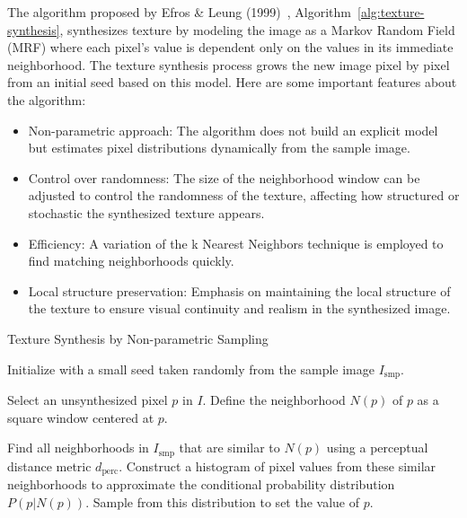 \documentclass{article}
\begin{document}
The algorithm proposed by Efros \& Leung (1999)~\cite{790383}, Algorithm~\ref{alg:texture-synthesis}, synthesizes texture by modeling the image as a Markov Random Field (MRF) where each pixel's value is dependent only on the values in its immediate neighborhood. 
The texture synthesis process grows the new image pixel by pixel from an initial seed based on this model. Here are some important features about the algorithm:
\begin{itemize}
  \item {Non-parametric approach:} The algorithm does not build an explicit model but estimates pixel distributions dynamically from the sample image.
  \item {Control over randomness:} The size of the neighborhood window can be adjusted to control the randomness of the texture, affecting how structured or stochastic the synthesized texture appears.
  \item {Efficiency:} A variation of the k Nearest Neighbors technique is employed to find matching neighborhoods quickly.
  \item {Local structure preservation:} Emphasis on maintaining the local structure of the texture to ensure visual continuity and realism in the synthesized image.
\end{itemize}

\begin{algorithm}
    \caption{Texture Synthesis by Non-parametric Sampling}\label{alg:texture-synthesis}
    \begin{algorithmic}[1]
    
    \State Initialize with a small seed taken randomly from the sample image $I_{\text{smp}}$.
    
        \State Select an unsynthesized pixel $p$ in $I$.
        \State Define the neighborhood $N(p)$ of $p$ as a square window centered at $p$.
        
        \State Find all neighborhoods in $I_{\text{smp}}$ that are similar to $N(p)$ using a perceptual distance metric $d_{\text{perc}}$.
        \State Construct a histogram of pixel values from these similar neighborhoods to approximate the conditional probability distribution $P(p|N(p))$.
        \State Sample from this distribution to set the value of $p$.
    \EndWhile
    
    \end{algorithmic}
\end{algorithm}
\end{document}
